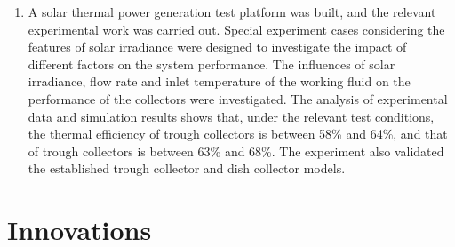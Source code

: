 \begin{enumerate}[label=(\arabic*)]
	\item A solar thermal power generation test platform was built, and the relevant experimental work was carried out. Special experiment cases considering the features of solar irradiance were designed to investigate the impact of different factors on the system performance. The influences of solar irradiance, flow rate and inlet temperature of the working fluid on the performance of the collectors were investigated. The analysis of experimental data and simulation results shows that, under the relevant test conditions, the thermal efficiency of trough collectors is between 58\% and 64\%, and that of trough collectors is between 63\% and 68\%. The experiment also validated the established trough collector and dish collector models.
\end{enumerate}

\newpage
\section{Innovations}

